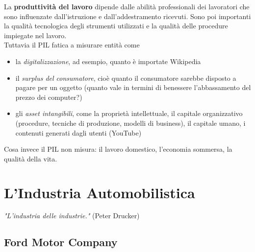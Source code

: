 \documentclass[a4paper,portrait,12pt]{article}
\theoremstyle{definition}
\begin{document}
La \textbf{produttività del lavoro} dipende dalle abilità professionali dei lavoratori che sono influenzate dall'istruzione e dall'addestramento ricevuti.
Sono poi importanti la qualità tecnologica degli strumenti utilizzati e la qualità delle procedure impiegate nel lavoro.\\

Tuttavia il PIL fatica a misurare entità come
\begin{itemize}
\item la \emph{digitalizzazione}, ad esempio, quanto è importate Wikipedia
\item il \emph{surplus del consumatore}, cioè quanto il consumatore sarebbe disposto a pagare per un oggetto (quanto vale in termini di benessere l'abbassamento del prezzo dei computer?)
\item gli \emph{asset intangibili}, come la proprietà intellettuale, il capitale organizzativo (procedure, tecniche di produzione, modelli di business), il capitale umano, i contenuti generati dagli utenti (YouTube)
\end{itemize}

Cosa invece il PIL non misura: il lavoro domestico, l'economia sommersa, la qualità della vita.



\newpage
\section{L'Industria Automobilistica}

\begin{center}
\emph{"L'industria delle industrie."} (Peter Drucker)
\end{center}


\subsection{Ford Motor Company}
\end{document}
